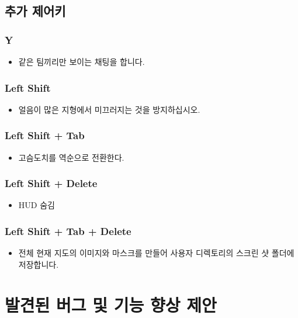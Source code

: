 \documentclass{report}
\begin{document}
\begin{flushleft}
    \section{추가 제어키}
    \subsection{Y}
    \begin{itemize}
        \item 같은 팀끼리만 보이는 채팅을 합니다. 
    \end{itemize}
    \subsection{Left Shift}
    \begin{itemize}
        \item 얼음이 많은 지형에서 미끄러지는 것을 방지하십시오. 
    \end{itemize}
    \subsection{Left Shift + Tab}
    \begin{itemize}
        \item 고슴도치를 역순으로 전환한다.
    \end{itemize}
    \subsection{Left Shift + Delete}
    \begin{itemize}
        \item HUD 숨김
    \end{itemize}
    \subsection{Left Shift + Tab + Delete}
    \begin{itemize}
        \item 전체 현재 지도의 이미지와 마스크를 만들어 사용자 디렉토리의 스크린 샷 폴더에 저장합니다.
    \end{itemize}
    
    
    
     \chapter{발견된 버그 및 기능 향상 제안}

\end{flushleft}
\end{document}
